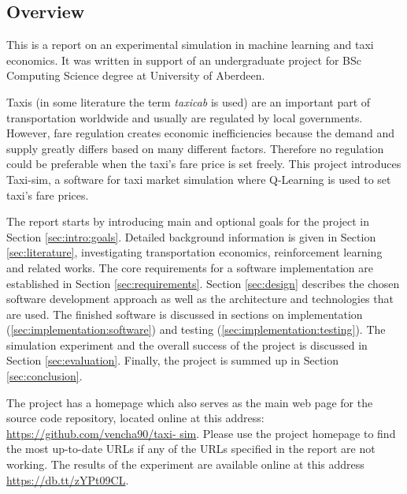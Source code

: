 \subsection{Overview}
\label{sec:intro:overview}

This is a report on an experimental simulation in machine learning and taxi
economics. It was written in support of an undergraduate project for BSc
Computing Science degree at University of Aberdeen.

Taxis (in some literature the term \textit{taxicab} is used) are an important
part of transportation worldwide and usually are regulated by local
governments. However, fare regulation creates economic inefficiencies because
the demand and supply greatly differs based on many different factors.
Therefore no regulation could be preferable when the taxi's fare price is set
freely. This project introduces Taxi-sim, a software for taxi market simulation
where Q-Learning is used to set taxi's fare prices.

The report starts by introducing main and optional goals for the project in
Section \ref{sec:intro:goals}. Detailed background information is given in
Section \ref{sec:literature}, investigating transportation economics,
reinforcement learning and related works. The core requirements for a software
implementation are established in Section \ref{sec:requirements}. Section
\ref{sec:design} describes the chosen software development approach as well as
the architecture and technologies that are used. The finished software is
discussed in sections on implementation (\ref{sec:implementation:software}) and
testing (\ref{sec:implementation:testing}). The simulation experiment and the
overall success of the project is discussed in Section \ref{sec:evaluation}.
Finally, the project is summed up in Section \ref{sec:conclusion}.

The project has a homepage which also serves as the main web page for the
source code repository, located online at this address:
\url{https://github.com/vencha90/taxi- sim}. Please use the project homepage to
find the most up-to-date URLs if any of the URLs specified in the report are
not working. The results of the experiment are available online at this address
\url{https://db.tt/zYPt09CL}.
